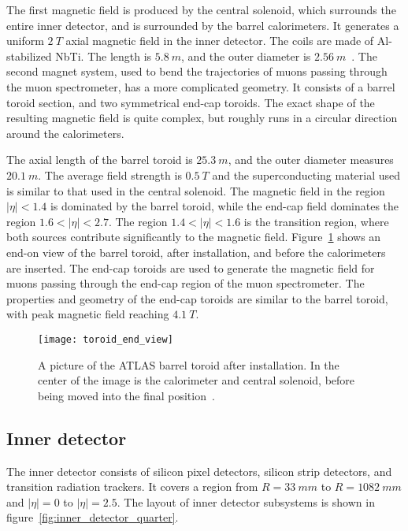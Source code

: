 The first magnetic field is produced by the central solenoid, which surrounds the entire inner detector, and is surrounded by the barrel calorimeters.
It generates a uniform $2~T$ axial magnetic field in the inner detector.
The coils are made of Al-stabilized NbTi. The length is $5.8~m$, and the outer diameter is $2.56~m$~\cite{atlas-detector-2008}.
The second magnet system, used to bend the trajectories of muons passing through the muon spectrometer, has a more complicated geometry.
It consists of a barrel toroid section, and two symmetrical end-cap toroids.
The exact shape of the resulting magnetic field is quite complex, but roughly runs in a circular direction around the calorimeters.

The axial length of the barrel toroid is $25.3~m$, and the outer diameter measures $20.1~m$.
The average field strength is $0.5~T$ and the superconducting material used is similar to that used in the central solenoid\cite{atlas-detector-2008}.
The magnetic field in the region $|\eta|<1.4$ is dominated by the barrel toroid, while the end-cap field dominates the region $1.6 < |\eta| < 2.7$.
The region $1.4 < |\eta| < 1.6$ is the transition region, where both sources contribute significantly to the magnetic field.
Figure~\ref{fig:toroid_end_view} shows an end-on view of the barrel toroid, after installation, and before the calorimeters are inserted.
The end-cap toroids are used to generate the magnetic field for muons passing through the end-cap region of the muon spectrometer.
The properties and geometry of the end-cap toroids are similar to the barrel toroid,
with peak magnetic field reaching $4.1~T$\cite{atlas-detector-2008}.

\begin{figure}[!ht]\centering
\texttt{[image: toroid\_end\_view]}
\caption{A picture of the ATLAS barrel toroid after installation.
In the center of the image is the calorimeter and central solenoid, before being moved into the final position~\cite{atlas-detector-2008}.}
\label{fig:toroid_end_view}
\end{figure}

\subsection{Inner detector}\label{subsec:inner_detector}
The inner detector consists of silicon pixel detectors, silicon strip detectors, and transition radiation trackers.
It covers a region from $R = 33~mm$ to $R = 1082~mm$ and $|\eta| = 0$ to $|\eta| = 2.5$.
The layout of inner detector subsystems is shown in figure~\ref{fig:inner_detector_quarter}.


